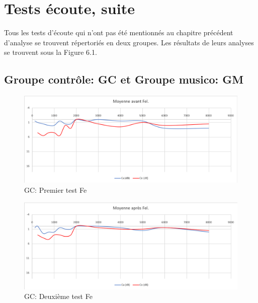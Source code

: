 \section{Tests écoute, suite }

Tous les  tests d'écoute qui n'ont pas été mentionnés au chapitre précédent d'analyse  se trouvent 
répertoriés
en deux groupes. Les résultats de leurs analyses se trouvent sous la Figure  6.1.
 \subsection*{Groupe contrôle: GC  et Groupe musico: GM}
 
  \begin{figure}[th]
 	\centering
 	\includegraphics[width=1\linewidth]{images/graphiques/moyavFEL.png}
 	\caption[GC: Patient Fe: 1° test]{GC: Premier test Fe}
 \end{figure}
 \begin{figure}[th]
 	\centering
 	\includegraphics[width=1\linewidth]{images/graphiques/moyaprFEL.png}
 	\caption[GC: Patient Fe: 2° test]{GC: Deuxième test Fe}
 \end{figure}
 
 \clearpage
 
